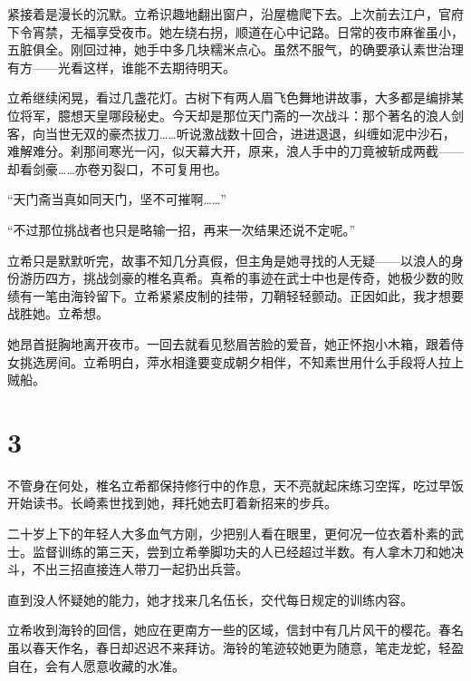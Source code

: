 \documentclass{article}
\begin{document}
紧接着是漫长的沉默。立希识趣地翻出窗户，沿屋檐爬下去。上次前去江户，官府下令宵禁，无福享受夜市。她左绕右拐，顺道在心中记路。日常的夜市麻雀虽小，五脏俱全。刚回过神，她手中多几块糯米点心。虽然不服气，的确要承认素世治理有方——光看这样，谁能不去期待明天。



立希继续闲晃，看过几盏花灯。古树下有两人眉飞色舞地讲故事，大多都是编排某位将军，臆想天皇哪段秘史。今天却是那位天门斋的一次战斗：那个著名的浪人剑客，向当世无双的豪杰拔刀……听说激战数十回合，进进退退，纠缠如泥中沙石，难解难分。刹那间寒光一闪，似天幕大开，原来，浪人手中的刀竟被斩成两截——却看剑豪……亦卷刃裂口，不可复用也。



“天门斋当真如同天门，坚不可摧啊……”



“不过那位挑战者也只是略输一招，再来一次结果还说不定呢。”



立希只是默默听完，故事不知几分真假，但主角是她寻找的人无疑——以浪人的身份游历四方，挑战剑豪的椎名真希。真希的事迹在武士中也是传奇，她极少数的败绩有一笔由海铃留下。立希紧紧皮制的挂带，刀鞘轻轻颤动。正因如此，我才想要战胜她。立希想。



她昂首挺胸地离开夜市。一回去就看见愁眉苦脸的爱音，她正怀抱小木箱，跟着侍女挑选房间。立希明白，萍水相逢要变成朝夕相伴，不知素世用什么手段将人拉上贼船。





{\centering\section*{3}}





不管身在何处，椎名立希都保持修行中的作息，天不亮就起床练习空挥，吃过早饭开始读书。长崎素世找到她，拜托她去盯着新招来的步兵。



二十岁上下的年轻人大多血气方刚，少把别人看在眼里，更何况一位衣着朴素的武士。监督训练的第三天，尝到立希拳脚功夫的人已经超过半数。有人拿木刀和她决斗，不出三招直接连人带刀一起扔出兵营。



直到没人怀疑她的能力，她才找来几名伍长，交代每日规定的训练内容。



立希收到海铃的回信，她应在更南方一些的区域，信封中有几片风干的樱花。春名虽以春天作名，春日却迟迟不来拜访。海铃的笔迹较她更为随意，笔走龙蛇，轻盈自在，会有人愿意收藏的水准。
\end{document}
